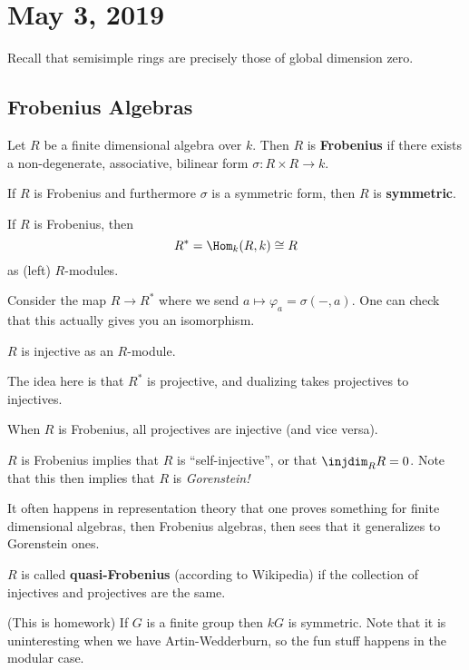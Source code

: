\documentclass[12pt]{article}
\begin{document}
\section{May 3, 2019}
Recall that semisimple rings are precisely those of global dimension zero. 
\subsection{Frobenius Algebras}
\begin{defn}
	Let $R$ be a finite dimensional algebra over $k$. Then $R$ is \textbf{Frobenius} if there exists a non-degenerate,
	associative, bilinear form $\sigma:R\times R\to k$.
\end{defn}
\begin{defn}
	If $R$ is Frobenius and furthermore $\sigma$ is a symmetric form, then $R$ is \textbf{symmetric}.
\end{defn}
\begin{prop}
	If $R$ is Frobenius, then
	\[R^\ast=\Hom_k(R,k)\cong R\]
	as (left) $R$-modules.
\end{prop}
\begin{prf}
	Consider the map $R\to R^\ast$  where we send $a\mapsto \varphi_a=\sigma(-,a)$. One can check that this
	actually gives you an isomorphism.
\end{prf}
\begin{cor}
	$R$ is injective as an $R$-module.
\end{cor}
\begin{rmk}
	The idea here is that $R^*$ is projective, and dualizing takes projectives to injectives.
\end{rmk}
\begin{cor}
	When $R$ is Frobenius, all projectives are injective (and vice versa).
\end{cor}
\begin{rmk}
	$R$ is Frobenius implies that $R$ is ``self-injective'', or that $\injdim_RR=0$. Note that this 
	then implies that $R$ is \textit{Gorenstein!}

	It often happens in representation theory that one proves something for finite dimensional algebras, 
	then Frobenius algebras, then sees that it generalizes to Gorenstein ones.
\end{rmk}
\begin{defn}
	$R$ is called \textbf{quasi-Frobenius} (according to Wikipedia) if the collection of injectives and 
	projectives are the same.
\end{defn}
\begin{ex}
	(This is homework) If $G$ is a finite group then $kG$ is symmetric. Note that it is uninteresting when 
	we have Artin-Wedderburn, so the fun stuff happens in the modular case.
\end{ex}
\end{document}
